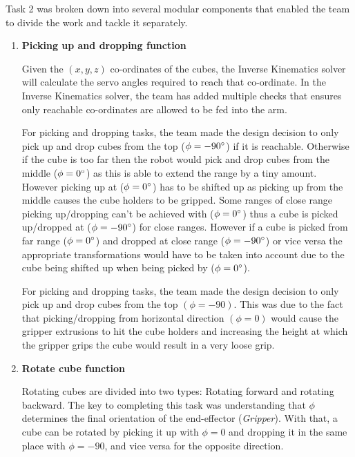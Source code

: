 \documentclass[9pt, a4paper]{article}
\begin{document}
Task 2 was broken down into several modular components that enabled the team to
divide the work and tackle it separately. 
\begin{enumerate}
  \item \textbf{Picking up and dropping function}
  
  Given the $(x,y,z)$ co-ordinates of the cubes, the Inverse Kinematics solver
  will calculate the servo angles required to reach that co-ordinate. In the
  Inverse Kinematics solver, the team has added multiple checks that ensures
  only reachable co-ordinates are allowed to be fed into the arm. 
  
  For picking and dropping tasks, the team made the design decision to only pick up and drop cubes from
  the top ($\phi = -90 \degree $) if it is reachable. Otherwise if the cube is too far then the
  robot would pick and drop cubes from the middle ($\phi = 0 \degree $) as this is able to
  extend the range by a tiny amount. However picking up at ($\phi =  0 \degree $) has to be
  shifted up as picking up from the middle causes the cube holders to be gripped.
  Some ranges of close range picking up/dropping can't be achieved with
  ($\phi = 0 \degree $) thus a cube is picked up/dropped at ($\phi = -90 \degree
  $) for close ranges. However if a cube is picked from far range ($\phi = 0\degree $) and dropped at close range
  ($\phi = -90 \degree $) or vice versa the appropriate transformations would have to be taken
  into account due to the cube being shifted up when being picked by ($\phi = 0\degree $).

  For picking and dropping tasks, the team made the design decision to only pick
  up and drop cubes from the top $(\phi = -90)$. This was due to the fact that
  picking/dropping from horizontal direction $(\phi=0)$ would cause the gripper
  extrusions to hit the cube holders and increasing the height at which the
  gripper grips the cube would result in a very loose grip. 
  
  \item \textbf{Rotate cube function}
  
  Rotating cubes are divided into two types: Rotating forward and rotating
  backward. The key to completing this task was understanding that $\phi$
  determines the final orientation of the end-effector (\textit{Gripper}). With
  that, a cube can be rotated by picking it up with $\phi = 0$ and dropping it in
  the same place with $\phi = -90$, and vice versa for the opposite direction. 
\end{enumerate}
\end{document}
